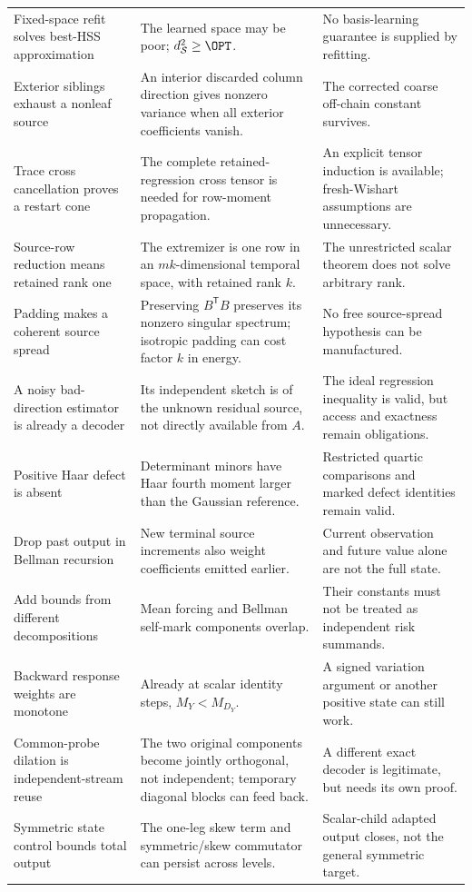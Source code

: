 \documentclass[11pt,oneside,openany,a4paper]{book}
\numberwithin{equation}{chapter}
\theoremstyle{definition}
\theoremstyle{remark}
\newcommand{\T}{\mathsf T}\newcommand{\Id}{I}
\begin{document}
\begin{longtable}{@{}>{\RaggedRight\arraybackslash}p{.29\linewidth}>{\RaggedRight\arraybackslash}p{.31\linewidth}>{\RaggedRight\arraybackslash}p{.33\linewidth}@{}}
Fixed-space refit solves best-HSS approximation&The learned space may be poor; $d_{\mathcal S}^2\ge\OPT$.&No basis-learning guarantee is supplied by refitting.\\
Exterior siblings exhaust a nonleaf source&An interior discarded column direction gives nonzero variance when all exterior coefficients vanish.&The corrected coarse off-chain constant survives.\\
Trace cross cancellation proves a restart cone&The complete retained-regression cross tensor is needed for row-moment propagation.&An explicit tensor induction is available; fresh-Wishart assumptions are unnecessary.\\
Source-row reduction means retained rank one&The extremizer is one row in an $mk$-dimensional temporal space, with retained rank $k$.&The unrestricted scalar theorem does not solve arbitrary rank.\\
Padding makes a coherent source spread&Preserving $B^\T B$ preserves its nonzero singular spectrum; isotropic padding can cost factor $k$ in energy.&No free source-spread hypothesis can be manufactured.\\
A noisy bad-direction estimator is already a decoder&Its independent sketch is of the unknown residual source, not directly available from $A$.&The ideal regression inequality is valid, but access and exactness remain obligations.\\
Positive Haar defect is absent&Determinant minors have Haar fourth moment larger than the Gaussian reference.&Restricted quartic comparisons and marked defect identities remain valid.\\
Drop past output in Bellman recursion&New terminal source increments also weight coefficients emitted earlier.&Current observation and future value alone are not the full state.\\
Add bounds from different decompositions&Mean forcing and Bellman self-mark components overlap.&Their constants must not be treated as independent risk summands.\\
Backward response weights are monotone&Already at scalar identity steps, $M_Y<M_{D_Y}$.&A signed variation argument or another positive state can still work.\\
Common-probe dilation is independent-stream reuse&The two original components become jointly orthogonal, not independent; temporary diagonal blocks can feed back.&A different exact decoder is legitimate, but needs its own proof.\\
Symmetric state control bounds total output&The one-leg skew term and symmetric/skew commutator can persist across levels.&Scalar-child adapted output closes, not the general symmetric target.\\

\end{longtable}
\end{document}
